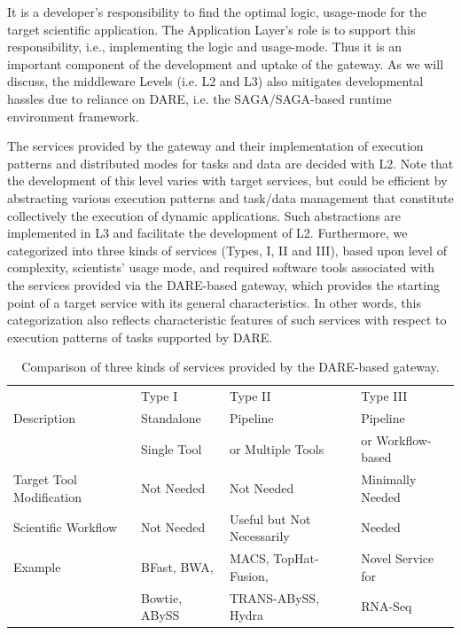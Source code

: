 \documentclass[]{svjour3}
\begin{document}
It is a developer's responsibility to find the optimal logic,
usage-mode for the target scientific application. The Application
Layer's role is to support this responsibility, i.e., implementing the
logic and usage-mode. Thus it is an important component of the
development and uptake of the gateway. As we will discuss, the
middleware Levels (i.e. L2 and L3) also mitigates developmental
hassles due to reliance on DARE, i.e. the SAGA/SAGA-based runtime
environment framework.

The services provided by the gateway and their implementation of
execution patterns and distributed modes for tasks and data are
decided with L2. Note that the development of this level varies with
target services, but could be efficient by abstracting various
execution patterns and task/data management that constitute
collectively the execution of dynamic applications. Such abstractions
are implemented in L3 and facilitate the development of
L2. Furthermore, we categorized into three kinds of services (Types,
I, II and III), based upon level of complexity, scientists' usage
mode, and required software tools associated with the services
provided via the DARE-based gateway, which provides the starting point
of a target service with its general characteristics. In other words,
this categorization also reflects characteristic features of such
services with respect to execution patterns of tasks supported by
DARE.

\begin{table}[!h]
\centering
\begin{tabular}{| l | l | l | l |} \hline \rowcolor[rgb]{0.8,0.8,0.8} &
Type I & Type II & Type III \\ Description & Standalone  & Pipeline & Pipeline \\ 
& Single Tool  & or Multiple Tools &  or Workflow-based \\\hline 
Target Tool Modification & Not Needed &
Not Needed & Minimally Needed \\ \hline Scientific Workflow & Not Needed & Useful but Not Necessarily &
Needed \\ \hline 
Example & BFast, BWA,  & MACS, TopHat-Fusion,  &   Novel Service for 
 \\
 &  Bowtie, ABySS  & TRANS-ABySS, Hydra & RNA-Seq \\
\hline
\end{tabular}
 \caption{Comparison of three kinds of services provided by the DARE-based gateway. }
\label{table:three-type-service}
\end{table}
\end{document}
